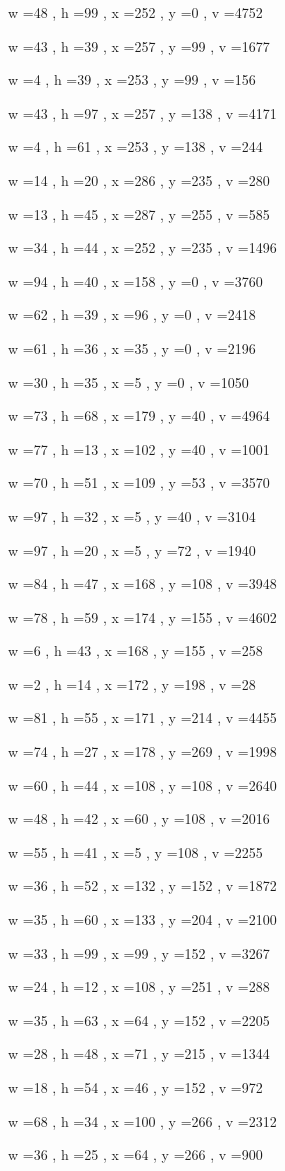 \documentclass[11pt]{article}
\begin{document}
w =48 , h =99 , x =252 , y =0 , v =4752
\par
w =43 , h =39 , x =257 , y =99 , v =1677
\par
w =4 , h =39 , x =253 , y =99 , v =156
\par
w =43 , h =97 , x =257 , y =138 , v =4171
\par
w =4 , h =61 , x =253 , y =138 , v =244
\par
w =14 , h =20 , x =286 , y =235 , v =280
\par
w =13 , h =45 , x =287 , y =255 , v =585
\par
w =34 , h =44 , x =252 , y =235 , v =1496
\par
w =94 , h =40 , x =158 , y =0 , v =3760
\par
w =62 , h =39 , x =96 , y =0 , v =2418
\par
w =61 , h =36 , x =35 , y =0 , v =2196
\par
w =30 , h =35 , x =5 , y =0 , v =1050
\par
w =73 , h =68 , x =179 , y =40 , v =4964
\par
w =77 , h =13 , x =102 , y =40 , v =1001
\par
w =70 , h =51 , x =109 , y =53 , v =3570
\par
w =97 , h =32 , x =5 , y =40 , v =3104
\par
w =97 , h =20 , x =5 , y =72 , v =1940
\par
w =84 , h =47 , x =168 , y =108 , v =3948
\par
w =78 , h =59 , x =174 , y =155 , v =4602
\par
w =6 , h =43 , x =168 , y =155 , v =258
\par
w =2 , h =14 , x =172 , y =198 , v =28
\par
w =81 , h =55 , x =171 , y =214 , v =4455
\par
w =74 , h =27 , x =178 , y =269 , v =1998
\par
w =60 , h =44 , x =108 , y =108 , v =2640
\par
w =48 , h =42 , x =60 , y =108 , v =2016
\par
w =55 , h =41 , x =5 , y =108 , v =2255
\par
w =36 , h =52 , x =132 , y =152 , v =1872
\par
w =35 , h =60 , x =133 , y =204 , v =2100
\par
w =33 , h =99 , x =99 , y =152 , v =3267
\par
w =24 , h =12 , x =108 , y =251 , v =288
\par
w =35 , h =63 , x =64 , y =152 , v =2205
\par
w =28 , h =48 , x =71 , y =215 , v =1344
\par
w =18 , h =54 , x =46 , y =152 , v =972
\par
w =68 , h =34 , x =100 , y =266 , v =2312
\par
w =36 , h =25 , x =64 , y =266 , v =900
\par
\newpage
\end{document}
